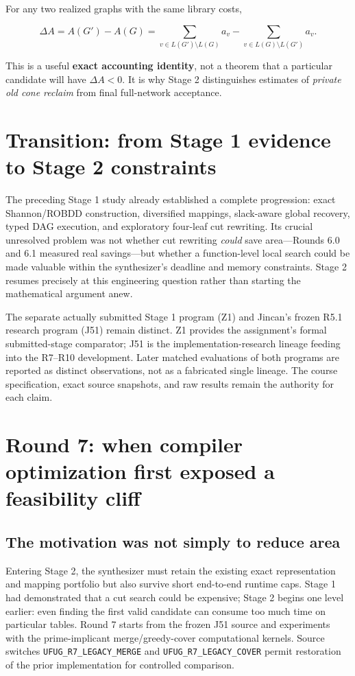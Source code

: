 For any two realized graphs with the same library costs,

\[
\Delta A=A(G')-A(G)
=\sum_{v\in L(G')\setminus L(G)}a_v
 -\sum_{v\in L(G)\setminus L(G')}a_v.
\]

This is a useful \textbf{exact accounting identity}, not a theorem that a particular candidate will have \(\Delta A<0\). It is why Stage 2 distinguishes estimates of \emph{private old cone reclaim} from final full-network acceptance.

\section{Transition: from Stage 1 evidence to Stage 2 constraints}
The preceding Stage 1 study already established a complete progression: exact Shannon/ROBDD construction, diversified mappings, slack-aware global recovery, typed DAG execution, and exploratory four-leaf cut rewriting. Its crucial unresolved problem was not whether cut rewriting \emph{could} save area---Rounds 6.0 and 6.1 measured real savings---but whether a function-level local search could be made valuable within the synthesizer's deadline and memory constraints. Stage 2 resumes precisely at this engineering question rather than starting the mathematical argument anew.

The separate actually submitted Stage 1 program (Z1) and Jincan's frozen R5.1 research program (J51) remain distinct. Z1 provides the assignment's formal submitted-stage comparator; J51 is the implementation-research lineage feeding into the R7--R10 development. Later matched evaluations of both programs are reported as distinct observations, not as a fabricated single lineage. The course specification, exact source snapshots, and raw results remain the authority for each claim.

\section{Round 7: when compiler optimization first exposed a feasibility cliff}\label{round-7-when-compiler-optimization-first-exposed-a-feasibility-cliff}

\subsection{The motivation was not simply to reduce area}\label{the-motivation-was-not-simply-to-reduce-area}

Entering Stage 2, the synthesizer must retain the existing exact representation and mapping portfolio but also survive short end-to-end runtime caps. Stage 1 had demonstrated that a cut search could be expensive; Stage 2 begins one level earlier: even finding the first valid candidate can consume too much time on particular tables. Round 7 starts from the frozen J51 source and experiments with the prime-implicant merge/greedy-cover computational kernels. Source switches \texttt{UFUG\_R7\_LEGACY\_MERGE} and \texttt{UFUG\_R7\_LEGACY\_COVER} permit restoration of the prior implementation for controlled comparison.

